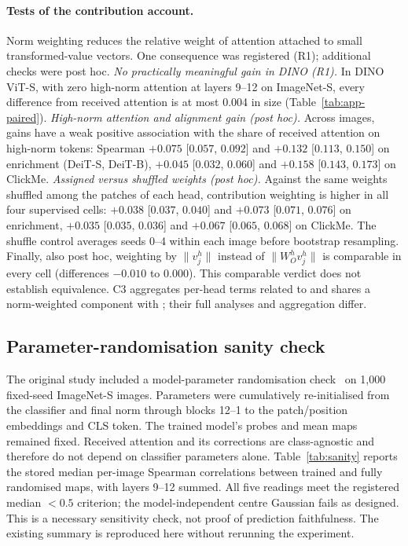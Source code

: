 \clearpage
\paragraph{Tests of the contribution account.} Norm weighting reduces the relative weight of attention attached to small transformed-value vectors. One consequence was registered (R1); additional checks were post hoc. \emph{No practically meaningful gain in DINO (R1).} In DINO ViT-S, with zero high-norm attention at layers 9--12 on ImageNet-S, every difference from received attention is at most 0.004 in size (Table~\ref{tab:app-paired}). \emph{High-norm attention and alignment gain (post hoc).} Across images, gains have a weak positive association with the share of received attention on high-norm tokens: Spearman $+0.075$ [$0.057$, $0.092$] and $+0.132$ [$0.113$, $0.150$] on enrichment (DeiT-S, DeiT-B), $+0.045$ [$0.032$, $0.060$] and $+0.158$ [$0.143$, $0.173$] on ClickMe. \emph{Assigned versus shuffled weights (post hoc).} Against the same weights shuffled among the patches of each head, contribution weighting is higher in all four supervised cells: $+0.038$ [$0.037$, $0.040$] and $+0.073$ [$0.071$, $0.076$] on enrichment, $+0.035$ [$0.035$, $0.036$] and $+0.067$ [$0.065$, $0.068$] on ClickMe. The shuffle control averages seeds 0--4 within each image before bootstrap resampling. Finally, also post hoc, weighting by $\lVert v_j^h\rVert$ instead of $\lVert W_O^h v_j^h\rVert$ is comparable in every cell (differences $-0.010$ to $0.000$). This comparable verdict does not establish equivalence. C3 aggregates per-head terms related to \citet{kobayashi2020} and shares a norm-weighted component with \citet{zhu2024}; their full analyses and aggregation differ.

\subsection{Parameter-randomisation sanity check}
\label{app:sanity}

The original study included a model-parameter randomisation check~\citep{adebayo2018} on 1,000 fixed-seed ImageNet-S images. Parameters were cumulatively re-initialised from the classifier and final norm through blocks 12--1 to the patch/position embeddings and CLS token. The trained model's probes and mean maps remained fixed. Received attention and its corrections are class-agnostic and therefore do not depend on classifier parameters alone. Table~\ref{tab:sanity} reports the stored median per-image Spearman correlations between trained and fully randomised maps, with layers 9--12 summed. All five readings meet the registered median $<0.5$ criterion; the model-independent centre Gaussian fails as designed. This is a necessary sensitivity check, not proof of prediction faithfulness. The existing summary is reproduced here without rerunning the experiment.

